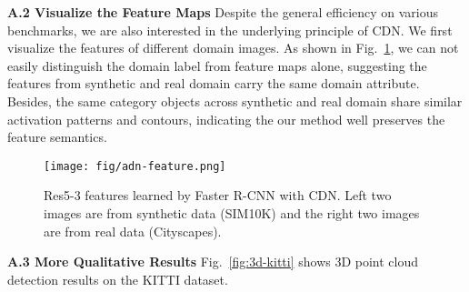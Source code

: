 \documentclass[runningheads]{llncs}
\begin{document}
\vspace{15pt}

\noindent \textbf{A.2 Visualize the Feature Maps}
Despite the general efficiency on various benchmarks, we are also interested in the underlying principle of CDN.
We first visualize the features of different domain images.
As shown in Fig.~\ref{fig:CDN-feature}, we can not easily distinguish the domain label from feature maps alone, suggesting the features from synthetic and real domain carry the same domain attribute.
Besides, the same category objects across synthetic and real domain share similar activation patterns and contours, indicating the our method well preserves the feature semantics.
\begin{figure}
    \centering
    \texttt{[image: fig/adn-feature.png]}
    \caption{Res5-3 features learned by Faster R-CNN with CDN. Left two images are from synthetic data (SIM10K)  and the right two images are from real data (Cityscapes).}
    \label{fig:CDN-feature}
\end{figure}


\vspace{15pt}

\noindent \textbf{A.3 More Qualitative Results}
Fig.~\ref{fig:3d-kitti} shows 3D point cloud detection results on the KITTI dataset. \\
\end{document}

